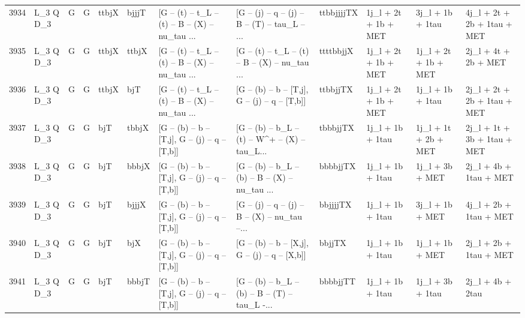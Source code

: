 \begin{tabular}{llllllllllll}
3934 &    L\_3 Q D\_3 &     G &     G &       ttbjX &       bjjjT &  [G -- (t) -- t\_L -- (t) -- B -- (X) -- nu\_tau ... &  [G -- (j) -- q -- (j) -- B -- (T) -- tau\_L -- ... &  ttbbjjjjTX &     1j\_l + 2t + 1b + MET &         3j\_l + 1b + 1tau &        4j\_l + 2t + 2b + 1tau + MET \\
3935 &    L\_3 Q D\_3 &     G &     G &       ttbjX &       ttbjX &  [G -- (t) -- t\_L -- (t) -- B -- (X) -- nu\_tau ... &  [G -- (t) -- t\_L -- (t) -- B -- (X) -- nu\_tau ... &   ttttbbjjX &     1j\_l + 2t + 1b + MET &     1j\_l + 2t + 1b + MET &               2j\_l + 4t + 2b + MET \\
3936 &    L\_3 Q D\_3 &     G &     G &       ttbjX &         bjT &  [G -- (t) -- t\_L -- (t) -- B -- (X) -- nu\_tau ... &   [G -- (b) -- b -- [T,j], G -- (j) -- q -- [T,b]] &    ttbbjjTX &     1j\_l + 2t + 1b + MET &         1j\_l + 1b + 1tau &        2j\_l + 2t + 2b + 1tau + MET \\
3937 &    L\_3 Q D\_3 &     G &     G &         bjT &       tbbjX &   [G -- (b) -- b -- [T,j], G -- (j) -- q -- [T,b]] &  [G -- (b) -- b\_L -- (t) -- W\textasciicircum + -- (X) -- tau\_L... &    tbbbjjTX &         1j\_l + 1b + 1tau &     1j\_l + 1t + 2b + MET &        2j\_l + 1t + 3b + 1tau + MET \\
3938 &    L\_3 Q D\_3 &     G &     G &         bjT &       bbbjX &   [G -- (b) -- b -- [T,j], G -- (j) -- q -- [T,b]] &  [G -- (b) -- b\_L -- (b) -- B -- (X) -- nu\_tau ... &    bbbbjjTX &         1j\_l + 1b + 1tau &          1j\_l + 3b + MET &             2j\_l + 4b + 1tau + MET \\
3939 &    L\_3 Q D\_3 &     G &     G &         bjT &       bjjjX &   [G -- (b) -- b -- [T,j], G -- (j) -- q -- [T,b]] &  [G -- (j) -- q -- (j) -- B -- (X) -- nu\_tau --... &    bbjjjjTX &         1j\_l + 1b + 1tau &          3j\_l + 1b + MET &             4j\_l + 2b + 1tau + MET \\
3940 &    L\_3 Q D\_3 &     G &     G &         bjT &         bjX &   [G -- (b) -- b -- [T,j], G -- (j) -- q -- [T,b]] &   [G -- (b) -- b -- [X,j], G -- (j) -- q -- [X,b]] &      bbjjTX &         1j\_l + 1b + 1tau &          1j\_l + 1b + MET &             2j\_l + 2b + 1tau + MET \\
3941 &    L\_3 Q D\_3 &     G &     G &         bjT &       bbbjT &   [G -- (b) -- b -- [T,j], G -- (j) -- q -- [T,b]] &  [G -- (b) -- b\_L -- (b) -- B -- (T) -- tau\_L -... &    bbbbjjTT &         1j\_l + 1b + 1tau &         1j\_l + 3b + 1tau &                   2j\_l + 4b + 2tau \\

\end{tabular}
